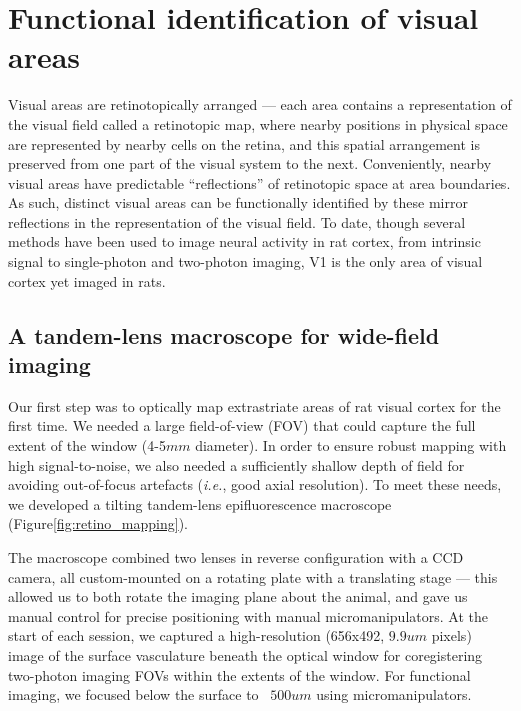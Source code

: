 \section{Functional identification of visual areas}
Visual areas are retinotopically arranged --- each area contains a representation of the visual field called a retinotopic map, where nearby positions in physical space are represented by nearby cells on the retina, and this spatial arrangement is preserved from one part of the visual system to the next. Conveniently, nearby visual areas have predictable ``reflections'' of retinotopic space at area boundaries. As such, distinct visual areas can be functionally identified by these mirror reflections in the representation of the visual field. To date, though several methods have been used to image neural activity in rat cortex, from intrinsic signal\cite{Gias2005} to single-photon \cite{Scott2018} and two-photon \cite{Ohki2005, Greenberg2008} imaging, V1 is the only area of visual cortex yet imaged in rats.

\subsection{A tandem-lens macroscope for wide-field imaging}
Our first step was to optically map extrastriate areas of rat visual cortex for the first time. We needed a large field-of-view (FOV) that could capture the full extent of the window (4-5$mm$ diameter). In order to ensure robust mapping with high signal-to-noise, we also needed a sufficiently shallow depth of field for avoiding out-of-focus artefacts (\textit{i.e.}, good axial resolution). To meet these needs, we developed a tilting tandem-lens epifluorescence macroscope\cite{Ratzlaff1991} (Figure\ref{fig:retino_mapping}). 

The macroscope combined two lenses in reverse configuration with a CCD camera, all custom-mounted on a rotating plate with a translating stage --- this allowed us to both rotate the imaging plane about the animal, and gave us manual control for precise positioning with manual micromanipulators. At the start of each session, we captured a high-resolution (656x492, $9.9um$ pixels) image of the surface vasculature beneath the optical window for coregistering two-photon imaging FOVs within the extents of the window. For functional imaging, we focused below the surface to ~$500um$ using micromanipulators.

